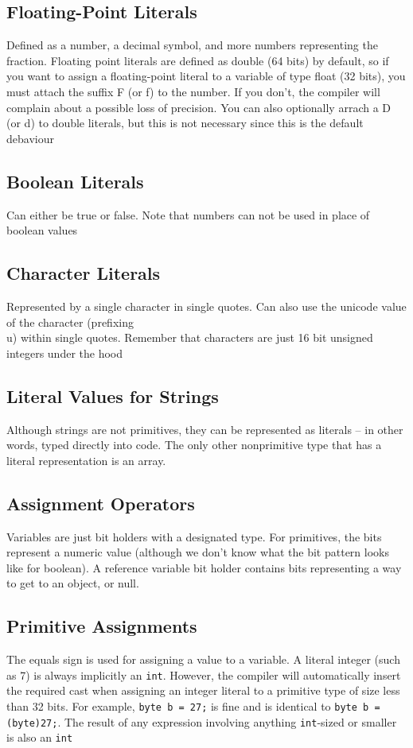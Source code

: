 \subsection{Floating-Point Literals}
Defined as a number, a decimal symbol, and more numbers representing the 
fraction. Floating point literals are defined as double (64 bits) by default, 
so if you want to assign a floating-point literal to a variable of type float 
(32 bits), you must attach the suffix F (or f) to the number. If you don't, the 
compiler will complain about a possible loss of precision. You can also 
optionally arrach a D (or d) to double literals, but this is not necessary 
since this is the default debaviour

\subsection{Boolean Literals}
Can either be true or false. Note that numbers can not be used in place of 
boolean values

\subsection{Character Literals}
Represented by a single character in single quotes. Can also use the unicode 
value of the character (prefixing \\u) within single quotes. Remember that 
characters are just 16 bit unsigned integers under the hood

\subsection{Literal Values for Strings}
Although strings are not primitives, they can be represented as literals -- in 
other words, typed directly into code. The only other nonprimitive type that 
has a literal representation is an array.

\subsection{Assignment Operators}
Variables are just bit holders with a designated type. For primitives, the bits 
represent a numeric value (although we don't know what the bit pattern looks 
like for boolean). A reference variable bit holder contains bits representing a 
way to get to an object, or null.

\subsection{Primitive Assignments}
The equals sign is used for assigning a value to a variable. A literal integer 
(such as 7) is always implicitly an \verb#int#. However, the compiler will 
automatically insert the required cast when assigning an integer literal to a 
primitive type of size less than 32 bits. For example, \verb#byte b = 27;# is 
fine and is identical to \verb#byte b = (byte)27;#. The result of any 
expression involving anything \verb#int#-sized or smaller is also an \verb#int#

